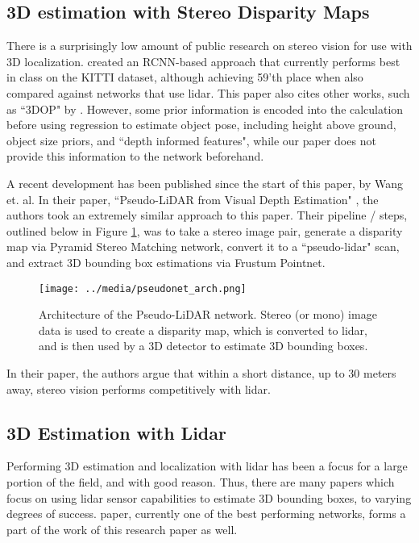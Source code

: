 \subsection{3D estimation with Stereo Disparity Maps}
There is a surprisingly low amount of public research on stereo vision for use with 3D localization. \cite{li_stereo_2019} created an RCNN-based approach that currently performs best in class on the KITTI dataset, although achieving 59'th place when also compared against networks that use lidar. This paper also cites other works, such as ``3DOP" by \cite{chen_3d_2016}. However, some prior information is encoded into the calculation before using regression to estimate object pose, including height above ground, object size priors, and ``depth informed features", while our paper does not provide this information to the network beforehand.

A recent development has been published since the start of this paper, by Wang et. al. In their paper, ``Pseudo-LiDAR from Visual Depth Estimation" \cite{wang_pseudo-lidar_2019}, the authors took an extremely similar approach to this paper. Their pipeline / steps, outlined below in Figure \ref{pseudonet_arch}, was to take a stereo image pair, generate a disparity map via Pyramid Stereo Matching network, convert it to a ``pseudo-lidar" scan, and extract 3D bounding box estimations via Frustum Pointnet. \\

\begin{figure}[h]
    \texttt{[image: ../media/pseudonet\_arch.png]}
    \caption{Architecture of the Pseudo-LiDAR network. Stereo (or mono) image data is used to create a disparity map, which is converted to lidar, and is then used by a 3D detector to estimate 3D bounding boxes.}
    \label{pseudonet_arch} 
\end{figure}

In their paper, the authors argue that within a short distance, up to 30 meters away, stereo vision performs competitively with lidar.

\subsection{3D Estimation with Lidar}
Performing 3D estimation and localization with lidar has been a focus for a large portion of the field, and with good reason. Thus, there are many papers which focus on using lidar sensor capabilities to estimate 3D bounding boxes, to varying degrees of success. \cite{qi_frustum_2017} paper, currently one of the best performing networks, forms a part of the work of this research paper as well.

